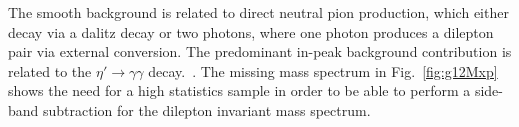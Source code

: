The smooth background is related to direct neutral pion production, which either decay via a dalitz decay or two photons, where one photon produces a dilepton pair via external conversion. The predominant in-peak background contribution is related to the $\eta'\rightarrow \gamma\gamma$ decay.~\cite{thesisschever}.
The missing mass spectrum in Fig.~\ref{fig:g12Mxp} shows the need for a high statistics sample in order to be able to perform a side-band subtraction for the dilepton invariant mass spectrum.
		\FloatBarrier